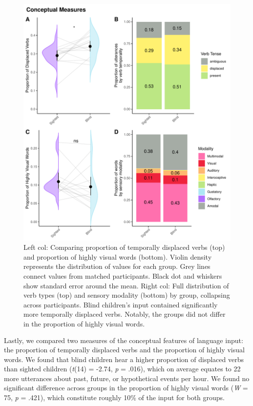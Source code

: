 \documentclass[
  man]{apa6}
\begin{document}
\begin{figure}
\centering
\includegraphics{input_quality_manuscript_files/figure-latex/conceptual-plots-1.pdf}
\caption{\label{fig:conceptual-plots}Left col: Comparing proportion of temporally displaced verbs (top) and proportion of highly visual words (bottom). Violin density represents the distribution of values for each group. Grey lines connect values from matched participants. Black dot and whiskers show standard error around the mean. Right col: Full distribution of verb types (top) and sensory modality (bottom) by group, collapsing across participants. Blind children's input contained significantly more temporally displaced verbs. Notably, the groups did not differ in the proportion of highly visual words.}
\end{figure}

Lastly, we compared two measures of the conceptual features of language input: the proportion of temporally displaced verbs and the proportion of highly visual words. We found that blind children hear a higher proportion of displaced verbs than sighted children (\emph{t}(14) = -2.74, \emph{p} = .016), which on average equates to 22 more utterances about past, future, or hypothetical events per hour. We found no significant difference across groups in the proportion of highly visual words (\emph{W} = 75, \emph{p} = .421), which constitute roughly 10\% of the input for both groups.
\end{document}
